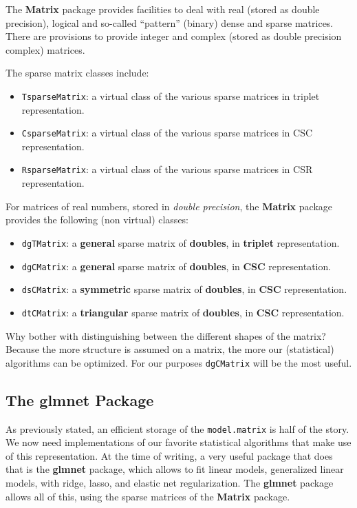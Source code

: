 \documentclass[]{book}
\providecommand{\tightlist}{%
  \setlength{\itemsep}{0pt}\setlength{\parskip}{0pt}}
\theoremstyle{definition}
\theoremstyle{definition}
\theoremstyle{definition}
\theoremstyle{remark}
\begin{document}
The \textbf{Matrix} package provides facilities to deal with real (stored as double precision), logical and so-called ``pattern'' (binary) dense and sparse matrices.
There are provisions to provide integer and complex (stored as double precision complex) matrices.

The sparse matrix classes include:

\begin{itemize}
\tightlist
\item
  \texttt{TsparseMatrix}: a virtual class of the various sparse matrices in triplet representation.
\item
  \texttt{CsparseMatrix}: a virtual class of the various sparse matrices in CSC representation.
\item
  \texttt{RsparseMatrix}: a virtual class of the various sparse matrices in CSR representation.
\end{itemize}

For matrices of real numbers, stored in \emph{double precision}, the \textbf{Matrix} package provides the following (non virtual) classes:

\begin{itemize}
\tightlist
\item
  \texttt{dgTMatrix}: a \textbf{general} sparse matrix of \textbf{doubles}, in \textbf{triplet} representation.
\item
  \texttt{dgCMatrix}: a \textbf{general} sparse matrix of \textbf{doubles}, in \textbf{CSC} representation.
\item
  \texttt{dsCMatrix}: a \textbf{symmetric} sparse matrix of \textbf{doubles}, in \textbf{CSC} representation.
\item
  \texttt{dtCMatrix}: a \textbf{triangular} sparse matrix of \textbf{doubles}, in \textbf{CSC} representation.
\end{itemize}

Why bother with distinguishing between the different shapes of the matrix?
Because the more structure is assumed on a matrix, the more our (statistical) algorithms can be optimized.
For our purposes \texttt{dgCMatrix} will be the most useful.

\hypertarget{the-glmnet-package}{%
\subsection{The glmnet Package}\label{the-glmnet-package}}

As previously stated, an efficient storage of the \texttt{model.matrix} is half of the story.
We now need implementations of our favorite statistical algorithms that make use of this representation.
At the time of writing, a very useful package that does that is the \textbf{glmnet} package, which allows to fit linear models, generalized linear models, with ridge, lasso, and elastic net regularization.
The \textbf{glmnet} package allows all of this, using the sparse matrices of the \textbf{Matrix} package.
\end{document}
